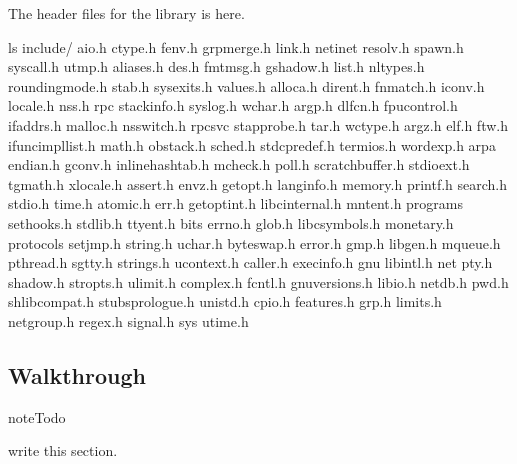\documentclass[letterpaper,10pt,english]{sphinxmanual}
\begin{document}
The header files for the library is here.

\begin{sphinxVerbatim}[commandchars=\\\{\}]
\PYGZdl{} ls include/
aio.h       ctype.h     fenv.h          grp\PYGZhy{}merge.h        link.h      netinet     resolv.h          spawn.h           syscall.h   utmp.h
aliases.h   des.h       fmtmsg.h        gshadow.h          list.h      nl\PYGZus{}types.h  rounding\PYGZhy{}mode.h   stab.h            sysexits.h  values.h
alloca.h    dirent.h    fnmatch.h       iconv.h            locale.h    nss.h       rpc               stackinfo.h       syslog.h    wchar.h
argp.h      dlfcn.h     fpu\PYGZus{}control.h   ifaddrs.h          malloc.h    nsswitch.h  rpcsvc            stap\PYGZhy{}probe.h      tar.h       wctype.h
argz.h      elf.h       ftw.h           ifunc\PYGZhy{}impl\PYGZhy{}list.h  math.h      obstack.h   sched.h           stdc\PYGZhy{}predef.h     termios.h   wordexp.h
arpa        endian.h    gconv.h         inline\PYGZhy{}hashtab.h   mcheck.h    poll.h      scratch\PYGZus{}buffer.h  stdio\PYGZus{}ext.h       tgmath.h    xlocale.h
assert.h    envz.h      getopt.h        langinfo.h         memory.h    printf.h    search.h          stdio.h           time.h
atomic.h    err.h       getopt\PYGZus{}int.h    libc\PYGZhy{}internal.h    mntent.h    programs    set\PYGZhy{}hooks.h       stdlib.h          ttyent.h
bits        errno.h     glob.h          libc\PYGZhy{}symbols.h     monetary.h  protocols   setjmp.h          string.h          uchar.h
byteswap.h  error.h     gmp.h           libgen.h           mqueue.h    pthread.h   sgtty.h           strings.h         ucontext.h
caller.h    execinfo.h  gnu             libintl.h          net         pty.h       shadow.h          stropts.h         ulimit.h
complex.h   fcntl.h     gnu\PYGZhy{}versions.h  libio.h            netdb.h     pwd.h       shlib\PYGZhy{}compat.h    stubs\PYGZhy{}prologue.h  unistd.h
cpio.h      features.h  grp.h           limits.h           netgroup.h  regex.h     signal.h          sys               utime.h
\end{sphinxVerbatim}


\subsection{Walkthrough }
\label{\detokenize{03_glibc:walkthrough-strlen}}
\begin{sphinxadmonition}{note}{Todo}

write this section.
\end{sphinxadmonition}
\end{document}
